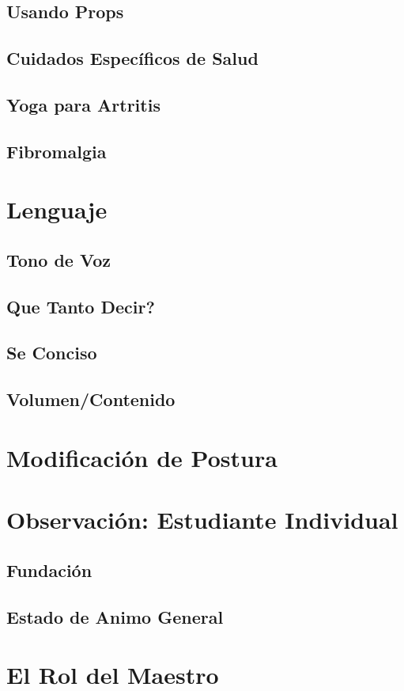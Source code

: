 \subsection{Usando Props}
\subsection{Cuidados Específicos de Salud}
\subsection{Yoga para Artritis}
\subsection{Fibromalgia}
\section{Lenguaje}
\subsection{Tono de Voz}
\subsection{Que Tanto Decir?}
\subsection{Se Conciso}
\subsection{Volumen/Contenido}
\section{Modificación de Postura}
\section{Observación: Estudiante Individual}
\subsection{Fundación}
\subsection{Estado de Animo General}
\section{El Rol del Maestro}
